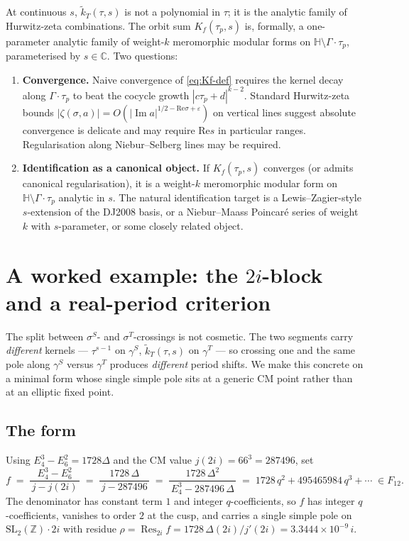 \documentclass[11pt]{article}
\newcommand{\HH}{\mathbb{H}}
\newcommand{\ZZ}{\mathbb{Z}}
\newcommand{\CC}{\mathbb{C}}
\newcommand{\SLZ}{\mathrm{SL}_2(\ZZ)}
\DeclareMathOperator{\Res}{Res}
\DeclareMathOperator{\im}{Im}
\newcommand{\re}{\mathrm{Re}}
\newcommand{\eps}{\varepsilon}
\begin{document}
At continuous $s$, $\widetilde{k}_T(\tau, s)$ is not a polynomial in
$\tau$; it is the analytic family of Hurwitz-zeta combinations.  The
orbit sum $K_f(\tau_p, s)$ is, formally, a one-parameter analytic
family of weight-$k$ meromorphic modular forms on $\HH \setminus
\Gamma\cdot\tau_p$, parameterised by $s \in \CC$.  Two questions:
\begin{enumerate}\itemsep0.2em
\item \textbf{Convergence.}  Naive convergence of \eqref{eq:Kf-def}
  requires the kernel decay along $\Gamma\cdot\tau_p$ to beat the
  cocycle growth $|c\tau_p + d|^{k - 2}$.  Standard Hurwitz-zeta
  bounds $|\zeta(\sigma, a)| = O(|\im a|^{1/2 - \re\sigma + \eps})$ on
  vertical lines suggest absolute convergence is delicate and may
  require $\re s$ in particular ranges.  Regularisation along
  Niebur--Selberg lines may be required.

\item \textbf{Identification as a canonical object.}  If $K_f(\tau_p,
  s)$ converges (or admits canonical regularisation), it is a
  weight-$k$ meromorphic modular form on $\HH\setminus\Gamma\cdot
  \tau_p$ analytic in $s$.  The natural identification target is a
  Lewis--Zagier-style $s$-extension of the DJ2008 basis, or a
  Niebur--Maass Poincar\'e series of weight $k$ with $s$-parameter,
  or some closely related object.
\end{enumerate}

\section{A worked example: the $2i$-block and a real-period criterion}\label{sec:2i-example}

The split between $\sigma^S$- and $\sigma^T$-crossings is not cosmetic.
The two segments carry \emph{different} kernels --- $\tau^{s-1}$ on
$\gamma^S$, $\widetilde{k}_T(\tau,s)$ on $\gamma^T$ --- so crossing one
and the same pole along $\gamma^S$ versus $\gamma^T$ produces
\emph{different} period shifts. We make this concrete on a minimal
form whose single simple pole sits at a generic CM point rather than at
an elliptic fixed point.

\subsection{The form}
Using $E_4^3 - E_6^2 = 1728\Delta$ and the CM value $j(2i) = 66^3 =
287496$, set
\begin{equation}\label{eq:2i-form}
  f \;=\; \frac{E_4^3 - E_6^2}{\,j - j(2i)\,}
       \;=\; \frac{1728\,\Delta}{\,j - 287496\,}
       \;=\; \frac{1728\,\Delta^2}{\,E_4^3 - 287496\,\Delta\,}
       \;=\; 1728\,q^2 + 495465984\,q^3 + \cdots \;\in F_{12}.
\end{equation}
The denominator has constant term $1$ and integer $q$-coefficients, so
$f$ has integer $q$-coefficients, vanishes to order $2$ at the cusp,
and carries a single simple pole on $\SLZ\cdot 2i$ with residue
$\rho = \Res_{2i} f = 1728\,\Delta(2i)/j'(2i) = 3.3444\times10^{-9}\,i$.
\end{document}

